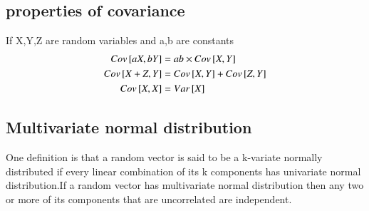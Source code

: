 \documentclass[journal,12pt,twocolumn]{IEEEtran}
\begin{document}
\subsection{properties of covariance}
If X,Y,Z are random variables and a,b are constants
\begin{align}
  Cov{}\left[aX,bY\right]&=ab\times Cov{}\left[X,Y\right]\\
Cov{}\left[X+Z,Y\right]&=Cov{}\left[X,Y\right]+Cov{}\left[Z,Y\right]\\
Cov{}\left[X,X\right]&=Var{}\left[X\right]
\end{align}
\subsection{Multivariate normal distribution}
One definition is that a random vector is said to be a k-variate normally distributed if every linear combination of its k components has univariate normal distribution.If a random vector has multivariate normal distribution then any two or more of its components that are uncorrelated are independent.
\end{document}
